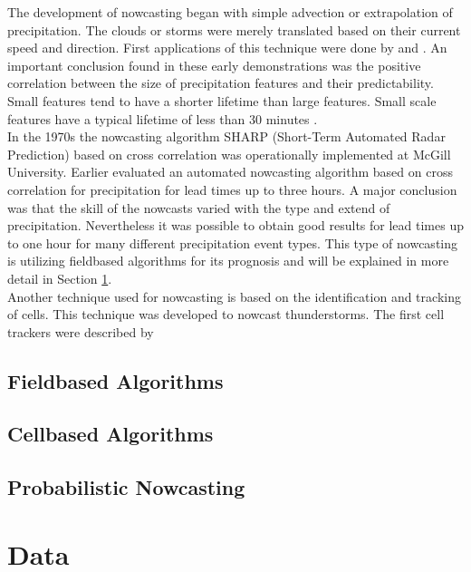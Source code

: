 \documentclass[11pt,twoside,a4paper,fleqn,x11names]{report}
\numberwithin{equation}{chapter}
\numberwithin{figure}{chapter}
\numberwithin{table}{chapter}
\begin{document}
The development of nowcasting began with simple advection or extrapolation of precipitation. The clouds or storms were merely translated based on their current speed and direction. First applications of this technique were done by \cite{hilst1960} and \cite{Noel}. An important conclusion found in these early demonstrations was the positive correlation between the size of precipitation features and their predictability. Small features tend to have a shorter lifetime than large features. Small scale features have a typical lifetime of less than 30 minutes \citep{Sene2009}.\\
In the 1970s the nowcasting algorithm SHARP (Short-Term Automated Radar Prediction) based on cross correlation was operationally implemented at McGill University. Earlier \cite{Austin1974} evaluated an automated nowcasting algorithm based on cross correlation for precipitation for lead times up to three hours. A major conclusion was that the skill of the nowcasts varied with the type and extend of precipitation. Nevertheless it was possible to obtain good results for lead times up to one hour for many different precipitation event types. This type of nowcasting is utilizing fieldbased algorithms for its prognosis and will be explained in more detail in Section \ref{sec:field}. \\
Another technique used for nowcasting is based on the identification and tracking of cells. This technique was developed to nowcast thunderstorms. The first cell trackers were described by \cite{wilk1970} 

\section{Fieldbased Algorithms}
\label{sec:field}
\section{Cellbased Algorithms}
\label{sec:cell}
\section{Probabilistic Nowcasting}
\label{sec:prob}
\chapter{Data}
\label{chap:data}
\end{document}
